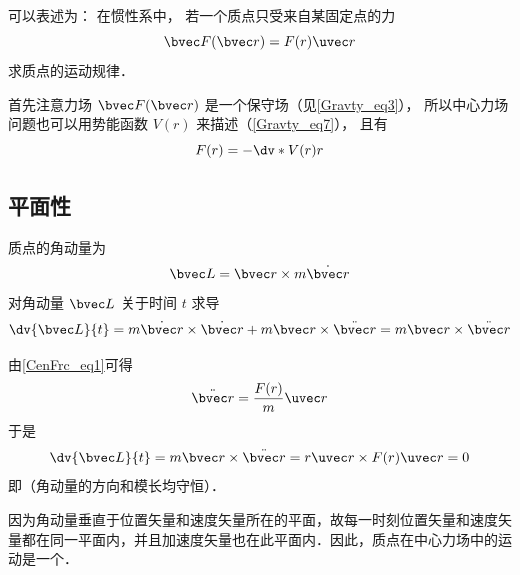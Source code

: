 
 可以表述为： 在惯性系中， 若一个质点只受来自某固定点的力
\begin{equation}\label{CenFrc_eq1}
\bvec F(\bvec r) = F(r) \uvec r
\end{equation}
求质点的运动规律．

首先注意力场 $\bvec F(\bvec r)$ 是一个保守场（见\autoref{Gravty_eq3}）， 所以中心力场问题也可以用势能函数 $V(r)$ 来描述（\autoref{Gravty_eq7}）， 且有
\begin{equation}
F(r) = -\dv*{V(r)}{r}
\end{equation}

\subsection{平面性}
质点的角动量为
\begin{equation}
\bvec L =\bvec r \times m \dot{\bvec r}
\end{equation}
对角动量 $\bvec L$ 关于时间 $t$ 求导
\begin{equation}
\dv{\bvec L}{t} =m \dot{\bvec r} \times \dot{\bvec r} +m \bvec r \times \ddot{\bvec r}=m \bvec r \times \ddot{\bvec r}
\end{equation}

由\autoref{CenFrc_eq1}可得
\begin{equation}
\ddot{\bvec r} = \frac{F(r)}{m}\uvec r
\end{equation}
于是
\begin{equation}
\dv{\bvec L}{t} =m \bvec r \times \ddot{\bvec r}= r \uvec r \times F(r)\uvec r=0
\end{equation}
即（角动量的方向和模长均守恒）．

因为角动量垂直于位置矢量和速度矢量所在的平面，故每一时刻位置矢量和速度矢量都在同一平面内，并且加速度矢量也在此平面内．因此，质点在中心力场中的运动是一个．

